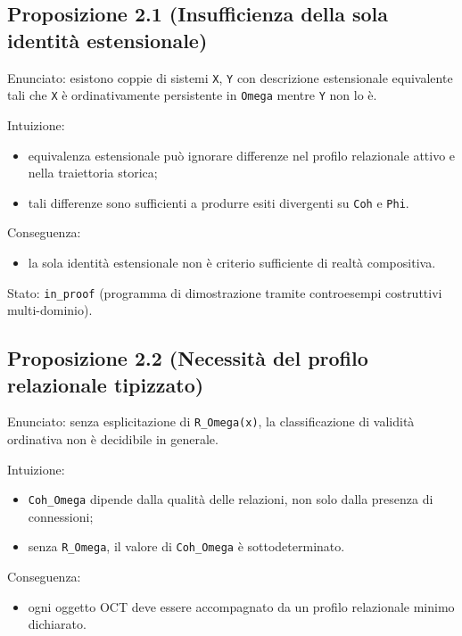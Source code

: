 \subsection{Proposizione 2.1 (Insufficienza della sola identità estensionale)}

Enunciato: esistono coppie di sistemi \texttt{X}, \texttt{Y} con descrizione estensionale equivalente tali che \texttt{X} è ordinativamente persistente in \texttt{Omega} mentre \texttt{Y} non lo è.

Intuizione:

\begin{itemize}
\tightlist
\item
  equivalenza estensionale può ignorare differenze nel profilo relazionale attivo e nella traiettoria storica;
\item
  tali differenze sono sufficienti a produrre esiti divergenti su \texttt{Coh} e \texttt{Phi}.
\end{itemize}

Conseguenza:

\begin{itemize}
\tightlist
\item
  la sola identità estensionale non è criterio sufficiente di realtà compositiva.
\end{itemize}

Stato: \texttt{in\_proof} (programma di dimostrazione tramite controesempi costruttivi multi-dominio).

\subsection{Proposizione 2.2 (Necessità del profilo relazionale tipizzato)}

Enunciato: senza esplicitazione di \texttt{R\_Omega(x)}, la classificazione di validità ordinativa non è decidibile in generale.

Intuizione:

\begin{itemize}
\tightlist
\item
  \texttt{Coh\_Omega} dipende dalla qualità delle relazioni, non solo dalla presenza di connessioni;
\item
  senza \texttt{R\_Omega}, il valore di \texttt{Coh\_Omega} è sottodeterminato.
\end{itemize}

Conseguenza:

\begin{itemize}
\tightlist
\item
  ogni oggetto OCT deve essere accompagnato da un profilo relazionale minimo dichiarato.
\end{itemize}


